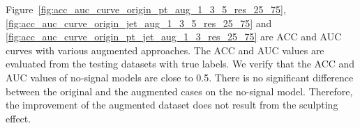 \documentclass[12pt]{article}
\begin{document}
		Figure~\ref{fig:acc_auc_curve_origin_pt_aug_1_3_5_res_25_75}, \ref{fig:acc_auc_curve_origin_jet_aug_1_3_5_res_25_75} and \ref{fig:acc_auc_curve_origin_pt_jet_aug_1_3_res_25_75} are ACC and AUC curves with various augmented approaches. The ACC and AUC values are evaluated from the testing datasets with true labels. We verify that the ACC and AUC values of no-signal models are close to 0.5. There is no significant difference between the original and the augmented cases on the no-signal model. Therefore, the improvement of the augmented dataset does not result from the sculpting effect.
		\begin{figure}[htpb]
			\centering
			 \\
\end{figure}
\end{document}
